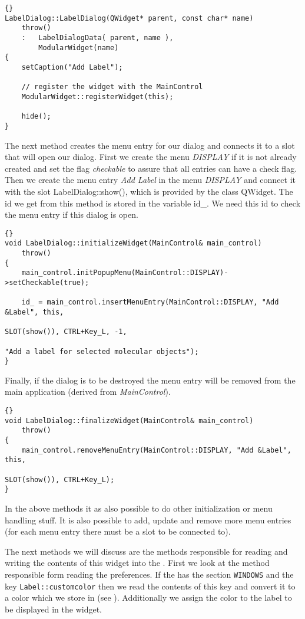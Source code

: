 \begin{lstlisting}{}
LabelDialog::LabelDialog(QWidget* parent, const char* name)
	throw()
	:	LabelDialogData( parent, name ),
		ModularWidget(name)
{
	setCaption("Add Label");

	// register the widget with the MainControl
	ModularWidget::registerWidget(this);

	hide();
}
\end{lstlisting}

The next method creates the menu entry for our dialog and connects it to a slot
that will open our dialog. First we create the menu {\em DISPLAY} if it is not
already created and set the flag {\em checkable} to assure that all entries
can have a check flag.
Then we create the menu entry {\em Add Label} in the menu {\em DISPLAY} and
connect it with the slot LabelDialog::show(), which is provided by the class QWidget. 
The id we get from this method is stored in the variable id\_. We need this
id to check the menu entry if this dialog is open.

\begin{lstlisting}{}
void LabelDialog::initializeWidget(MainControl& main_control)
	throw()
{
	main_control.initPopupMenu(MainControl::DISPLAY)->setCheckable(true);

	id_ = main_control.insertMenuEntry(MainControl::DISPLAY, "Add &Label", this,
																		 SLOT(show()), CTRL+Key_L, -1,
																		 "Add a label for selected molecular objects");   
}

\end{lstlisting}

Finally, if the dialog is to be destroyed the menu entry will be removed from
the main application (derived from {\em MainControl}).
\begin{lstlisting}{}
void LabelDialog::finalizeWidget(MainControl& main_control)
	throw()
{
	main_control.removeMenuEntry(MainControl::DISPLAY, "Add &Label", this,
															 SLOT(show()), CTRL+Key_L);   
}
\end{lstlisting}

In the above methods it as also possible to do other initialization or menu handling stuff.
It is also possible to add, update and remove more menu entries (for each menu entry
there must be a slot to be connected to).


The next methods we will discuss are the methods responsible for reading and
writing the contents of this widget into the . First we look at the
method responsible form reading the preferences.
If the  has the section {\tt WINDOWS} and the key {\tt Label::customcolor} then
we read the contents of this key and convert it to a color which we store in
 (see ). 
Additionally we assign the color to the label to be displayed in the widget.

